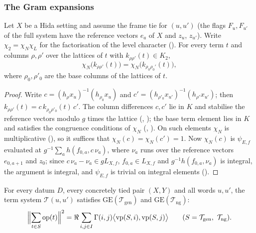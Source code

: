 \subsubsection{The Gram expansions}

\begin{lemma}\label{pf:sh-siegel:chiN}
Let $X$ be a Hida setting and assume the frame tie for $(u,u')$ (the flags $F_u,F_{u'}$ of the full system have the reference
vectors $e_a$ of $X$ and $z_u$, $z_{u'}$). Write $\chi_2=\chi_N\chi_L$ for the factorisation of the level character
(). For every term $t$ and columns $\rho,\rho'$ over the lattices of $t$
with $k_{\rho\rho'}(t)\in K_2$,
\[
\chi_N\bigl(k_{\rho\rho'}(t)\bigr)=\chi_N\bigl(k_{\rho_0\rho_0'}(t)\bigr),
\]
where $\rho_0,\rho'_0$ are the base columns of the lattices of $t$.
\end{lemma}

\begin{proof}
Write $c=(h_\rho x_u)^{-1}(h_{\rho_0}x_u)$ and $c'=(h_{\rho'_0}x_{u'})^{-1}(h_{\rho'}x_{u'})$; then
$k_{\rho\rho'}(t)=c\,k_{\rho_0\rho'_0}(t)\,c'$. The column differences $c,c'$ lie in $K$ and stabilise the reference vectors
modulo $g$ times the lattice (, ); the base term
element lies in $K$ and satisfies the congruence conditions of $\chi_N$ (,
). On such elements $\chi_N$ is multiplicative
(), so it suffices that $\chi_N(c)=\chi_N(c')=1$. Now $\chi_N(c)$ is
$\psi_{E,f}$ evaluated at $g^{-1}\sum_ah(f_{0,a},c\,\nu_a)$, where $\nu_a$ runs over the reference vectors $e_{0,a+1}$ and
$z_0$; since $c\,\nu_a-\nu_a\in gL_{X,f}$, $f_{0,a}\in L_{X,f}$ and $g^{-1}h(f_{0,a},\nu_a)$ is integral, the argument is
integral, and $\psi_{E,f}$ is trivial on integral elements ().
\end{proof}

\begin{proposition}\label{pf:sh-siegel:normexp}
For every datum $D$, every concretely tied pair $(X,Y)$ and all words $u,u'$, the term system $\mathcal T(u,u')$ satisfies
$\mathrm{GE}(\mathcal T_{\mathrm{gen}})$ and $\mathrm{GE}(\mathcal T_{\mathrm{ng}})$:
\[
\Bigl\|\sum_{t\in S}\mathrm{op}(t)\Bigr\|^2=\Re\sum_{i,j\in I}\Gamma(i,j)\bigl\langle\mathrm{vp}(S,i),\mathrm{vp}(S,j)\bigr\rangle
\qquad(S=\mathcal T_{\mathrm{gen}},\ \mathcal T_{\mathrm{ng}}).
\]
\end{proposition}

